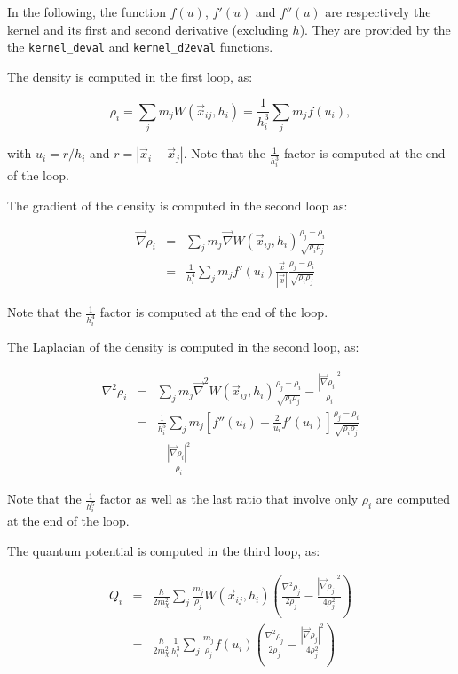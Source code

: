 In the following, the function $f(u)$, $f'(u)$ and $f''(u)$ are respectively
the kernel and its first and second derivative (excluding $h$).
They are provided by the the \texttt{kernel\_deval} and \texttt{kernel\_d2eval} functions.

The density is computed in the first loop, as:

\begin{equation}
  \rho_i = \sum_j m_j W(\vec{x}_{ij}, h_i) = \frac{1}{h_i^3} \sum_j  m_j f(u_i), 
  \label{eq:uldm:implementation:rho}
\end{equation}

with $u_i = r/h_i $ and $r=|\vec{x}_i-\vec{x}_j|$.
Note that the $\frac{1}{h_i^3}$ factor is computed at the end of the loop.


The gradient of the density is computed in the second loop as:

\begin{eqnarray}
  \label{eq:uldm:implementation:grad_rho}
  \vec{\nabla} \rho_i & = &  \sum_j m_j \vec{\nabla} W(\vec{x}_{ij}, h_i) \frac{\rho_j - \rho_i}{\sqrt{\rho_i \rho_j}} \\
                      & = & \frac{1}{h_i^4}  \sum_j m_j f'(u_i) \frac{\vec{x}}{|\vec{x}|} \frac{\rho_j - \rho_i}{\sqrt{\rho_i \rho_j}}
\end{eqnarray}

Note that the $\frac{1}{h_i^4}$ factor is computed at the end of the loop.


The Laplacian of the density is computed in the second loop, as:

\begin{eqnarray}
  \label{eq:uldm:implementation:laplacian_rho}
  \nabla^2 \rho_i
  & = &  \sum_j m_j \vec{\nabla}^2 W(\vec{x}_{ij}, h_i) \frac{\rho_j - \rho_i}{\sqrt{\rho_i \rho_j}} - \frac{|\vec{\nabla}\rho_i|^2}{\rho_i}\\
  & = & \frac{1}{h_i^5}  \sum_j m_j \left[ f''(u_i) + \frac{2}{u_i} f'(u_i) \right]  \frac{\rho_j - \rho_i}{\sqrt{\rho_i \rho_j}} \\
  && - \frac{|\vec{\nabla}\rho_i|^2}{\rho_i}
\end{eqnarray}

Note that the  $\frac{1}{h_i^5}$ factor as well as the last ratio that involve only $\rho_i$ are computed at the end of the loop.


The quantum potential is computed in the third loop, as:

\begin{eqnarray}
  \label{eq:uldm:implementation:Q}
  Q_i
  & = &  \frac{\hbar}{2 m^2_\chi }  \sum_j \frac{m_j}{\rho_j} W(\vec{x}_{ij}, h_i)
  \left( \frac{\nabla^2\rho_j}{2\rho_j} -\frac{|\vec{\nabla}\rho_j|^2}{4\rho^2_j} \right)\\
  & = &  \frac{\hbar}{2 m^2_\chi } \frac{1}{h_i^3}
         \sum_j \frac{m_j}{\rho_j} f(u_i) 
         \left( \frac{\nabla^2\rho_j}{2\rho_j} -\frac{|\vec{\nabla}\rho_j|^2}{4\rho^2_j} \right)
\end{eqnarray}

